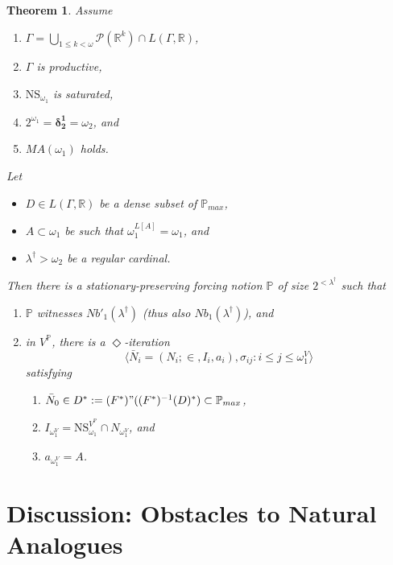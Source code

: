 \documentclass[12pt, twoside]{memoir}
\numberwithin{equation}{section}
\newtheorem{thm}{Theorem}[section]
\theoremstyle{definition}
\theoremstyle{remark}
\theoremstyle{definition}
\theoremstyle{definition}
\theoremstyle{definition}
\theoremstyle{remark}
\begin{document}
\begin{thm}\label{notion3}
Assume
\begin{enumerate}[label=(\roman*), leftmargin=40pt]
    \item $\Gamma  = \bigcup_{1 \leq k < \omega} \mathcal{P}(\mathbb{R}^{k}) \cap L(\Gamma, \mathbb{R})$,
    \item $\Gamma$ is productive,
    \item $\mathrm{NS}_{\omega_1}$ is saturated,
    \item $2^{\omega_1} = \mathbf{\delta^1_2} = \omega_2$, and
    \item $MA(\omega_1)$ holds.
\end{enumerate}
Let 
\begin{itemize}
    \item $D \in L(\Gamma, \mathbb{R})$ be a dense subset of $\mathbb{P}_{max}$,
    \item $A \subset \omega_1$ be such that $\omega_1^{L[A]} = \omega_1$, and
    \item $\lambda^{\dagger} > \omega_2$ be a regular cardinal.
\end{itemize}
Then there is a stationary-preserving forcing notion $\mathbb{P}$ of size $2^{< \lambda^{\dagger}}$ such that 
\begin{enumerate}[label=(\alph*)]
    \item $\mathbb{P}$ witnesses $Nb'_1(\lambda^{\dagger})$ (thus also $Nb_1(\lambda^{\dagger})$), and
    \item in $V^{\mathbb{P}}$, there is a $\Diamond$-iteration $$\langle \bar{N}_i = (N_i; \in, I_i, a_i), \sigma_{ij} : i \leq j \leq \omega_1^V \rangle$$ satisfying 
    \begin{enumerate}[label=(\arabic*), leftmargin=40pt]
        \item $\bar{N}_0 \in D^* := (F^*) " ((F^*)^{-1}(D)^*) \subset \mathbb{P}_{max}$,
        \item $I_{\omega_1^V} = \mathrm{NS}_{\omega_1}^{V^{\mathbb{P}}} \cap N_{\omega_1^V}$, and
        \item $a_{\omega_1^V} = A$.
    \end{enumerate}
\end{enumerate}
\end{thm}

\section{Discussion: Obstacles to Natural Analogues}\label{sect74}
\end{document}
